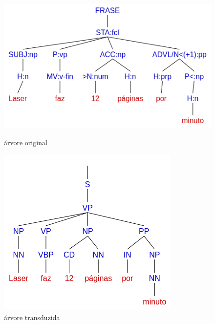 \begin{figure}[!ht]
    \centering
    \begin{minipage}{.45\textwidth}
        \includegraphics[width=\linewidth]{imagens/ec_bosque_sem_ponto_tree_orig.png}
        \caption{árvore original}
    \end{minipage}
    \begin{minipage}{.45\textwidth}
        \includegraphics[width=\linewidth]{imagens/ec_bosque_sem_ponto_tree_trans.png}
        \caption{árvore transduzida}
    \end{minipage}
    \begin{minipage}{.45\textwidth}

\end{minipage}
\end{figure}

